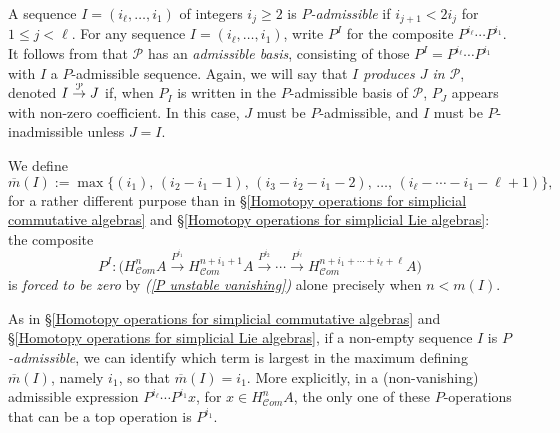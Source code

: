 \documentclass[11pt]{amsart}
\theoremstyle{plain}
\newtheorem{lem}[thm]{Lemma}
\theoremstyle{definition}
\renewcommand{\to}{\longrightarrow}
\newcommand{\scrC}{\mathscr{C}}
\newcommand{\calP}{\mathcal{P}}
\theoremstyle{plain}
\newcommand{\Palg}{{\calP}}
\newcommand{\minDimP}{\overline{m}}
\newcommand{\minDimDelta}{m}
\newcommand{\produces}[3]{#3:#1\sim #2}
\renewcommand{\produces}[3]{#1\rightarrow_{#3} #2}%
\renewcommand{\produces}[3]{#1\overset{\smash{#3}}{\rightarrow} #2}%
\newcommand{\algs}{\scrC\!\textit{om}}
\begin{document}
\begin{Constructing homotopy and cohomotopy operations}
A sequence $I=(i_\ell,\ldots,i_1)$ of integers $i_j\geq2$ is \emph{$P$-admissible} if $i_{j+1}<2i_j$ for $1\leq j <\ell$. For any sequence $I=(i_\ell,\ldots,i_1)$, write $P^I$ for the composite $P^{i_\ell}\cdots P^{i_1}$. It follows from \cite[Theorem I]{MR1089001} that $\Palg$ has an \emph{admissible basis}, consisting of those $P^I=P^{i_\ell}\cdots P^{i_{1}}$ with $I$ a $P$-admissible sequence.  Again, we will say that \emph{$I$ produces $J$ in $\Palg$}, denoted $\produces{I}{J}{\Palg}$ if, when $P_I$ is written in the $P$-admissible basis of $\Palg$, $P_J$ appears with non-zero coefficient. In this case, $J$ must be $P$-admissible, and $I$ must be $P$-inadmissible unless $J=I$.

We define
\[\minDimP(I):=\max\{(i_1),\,(i_2-i_1-1),\,(i_3-i_2-i_1-2),\,\ldots,\,(i_{\ell}-\cdots-i_1-\ell+1)\},\]
for a rather different purpose than in \S\ref{Homotopy operations for simplicial commutative algebras} and \S\ref{Homotopy operations for simplicial Lie algebras}: the composite 
\[P^I:\bigl(H_{\algs}^{n}A\overset{P^{i_1}}{\to}H_{\algs}^{n+i_1+1}A\overset{P^{i_2}}{\to}\cdots \overset{P^{i_\ell}}{\to}H_{\algs}^{n+i_1+\cdots +i_\ell+\ell}A\bigr)\]
is \emph{forced to be zero} by \emph{(\ref{P unstable vanishing})} alone precisely when $n<\minDimDelta(I)$.

As in \S\ref{Homotopy operations for simplicial commutative algebras} and \S\ref{Homotopy operations for simplicial Lie algebras}, if a non-empty sequence $I$  is \emph{$P$-admissible}, we can identify which term is largest in the maximum defining $\minDimP(I)$, namely $i_1$, so that $\minDimP(I)=i_1$. More explicitly, in a (non-vanishing) admissible expression $P^{i_\ell}\cdots P^{i_1}x$, for $x\in H^n_{\algs}A$, the only one of these $P$-operations that can be a top operation is $P^{i_{1}}$.




\end{Constructing homotopy and cohomotopy operations}
\end{document}
